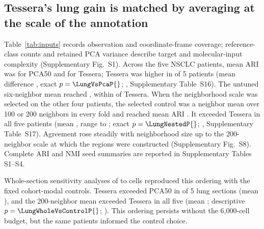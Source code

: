 
\subsection{Tessera's lung gain is matched by averaging at the scale of the annotation}
Table~\ref{tab:inputs} records observation and coordinate-frame coverage; reference-class counts and retained PCA variance describe target and molecular-input complexity (Supplementary Fig.~S1). Across the five NSCLC patients, mean ARI was \NsclcPca{} for PCA50 and \NsclcFull{} for Tessera; Tessera was higher in \LungVsPcaPositive{} of 5 patients (mean difference \NsclcDelta{}, exact \(p=\LungVsPcaP{}\); , Supplementary Table~S16). The untuned six-neighbor mean reached \NsclcMean{}, within \NsclcVsMean{} of Tessera. When the neighborhood scale was selected on the other four patients, the selected control was a neighbor mean over 100 or 200 neighbors in every fold and reached mean ARI \LungNestedControlMean{}. It exceeded Tessera in all five patients (mean \LungNestedDelta{}, range \LungNestedMin{} to \LungNestedMax{}; exact \(p=\LungNestedP{}\); , Supplementary Table~S17). Agreement rose steadily with neighborhood size up to the 200-neighbor scale at which the regions were constructed (Supplementary Fig.~S8). Complete ARI and NMI seed summaries are reported in Supplementary Tables S1--S4.

Whole-section sensitivity analyses of \WholeCellsMin{} to \WholeCellsMax{} cells reproduced this ordering with the fixed cohort-modal controls. Tessera exceeded PCA50 in \LungWholeVsPcaPositive{} of 5 lung sections (mean \LungWholeVsPcaMean{}), and the 200-neighbor mean exceeded Tessera in all five (mean \LungWholeVsControlMean{}; descriptive \(p=\LungWholeVsControlP{}\); ). This ordering persists without the 6,000-cell budget, but the same patients informed the control choice.







